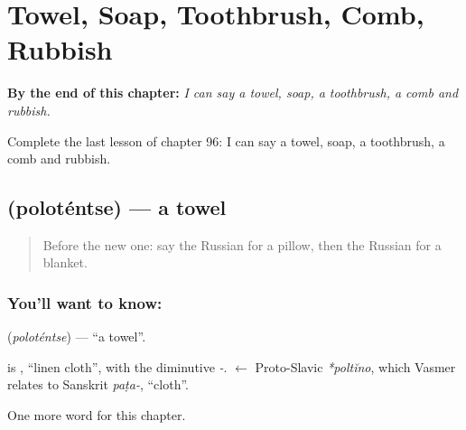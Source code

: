 
\chapter{Towel, Soap, Toothbrush, Comb, Rubbish}
\label{ch:ru-towel-soap-toothbrush-comb-rubbish}

\begin{chapteropening}
\textbf{By the end of this chapter:} \emph{I can say a towel, soap, a toothbrush, a comb and rubbish.}

Complete the last lesson of chapter 96: I can say a towel, soap, a toothbrush, a comb and rubbish.
\end{chapteropening}

\section[\texorpdfstring{\ru{полотенце} (poloténtse)}{полотенце (poloténtse)}]{ (poloténtse) — a towel}

\label{lesson:RU-C96-towel}



\begin{quote}
Before the new one: say the Russian for a pillow, then the Russian for a blanket.
\end{quote}

\subsection*{You'll want to know: }
\textbf{} (\emph{poloténtse}) — \textquotedblleft{}a towel\textquotedblright{}.

\begin{cousinweb}
\textbf{} is \emph{}, \textquotedblleft{}linen cloth\textquotedblright{}, with the diminutive \emph{-}. \emph{} $\leftarrow$ Proto-Slavic \emph{*poltĭno}, which Vasmer relates to Sanskrit \emph{paṭa-}, \textquotedblleft{}cloth\textquotedblright{}.
\end{cousinweb}

\begin{grammarlens}[title={What you've built}]
One more word for this chapter.
\end{grammarlens}

